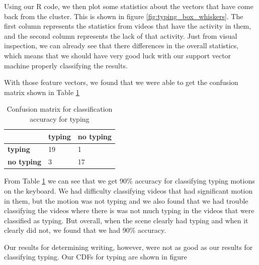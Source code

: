 Using our R code, we then plot some statistics about the vectors that have come
back from the cluster. This is shown in figure \ref{fig:typing_box_whiskers}.
The first column represents the statistics from videos that have the activity
in them, and the second column represents the lack of that activity. Just from
visual inspection, we can already see that there differences in the overall
statistics, which means that we should have very good luck with our support
vector machine properly classifying the results.

\FloatBarrier


With those feature vectors, we found that we were able to get the confusion matrix
shown in Table \ref{tab:typing_confusion}
\begin{table}[h]
  \begin{centering}
  \begin{tabular}{| l | l | l |}
  \hline
   & \textbf{typing} & \textbf{no typing}\\ \hline
  \textbf{typing} & 19 & 1 \\ \hline
  \textbf{no typing} & 3 & 17 \\ \hline
  \end{tabular}
  \caption{Confusion matrix for classification accuracy for typing}
  \label{tab:typing_confusion}
\end{centering}
\end{table}

\FloatBarrier

From Table \ref{tab:typing_confusion} we can see that we get 90\% accuracy for
classifying typing motions on the keyboard. We had difficulty classifying
videos that had significant motion in them, but the motion was not typing and
we also found that we had trouble classifying the videos where there is was
not much typing in the videos that were classified as typing. But overall, when the
scene clearly had typing and when it clearly did not, we found that we had
90\% accuracy.

Our results for determining writing, however, were not as good as our results
for classifying typing. Our CDFs for typing are shown in figure

